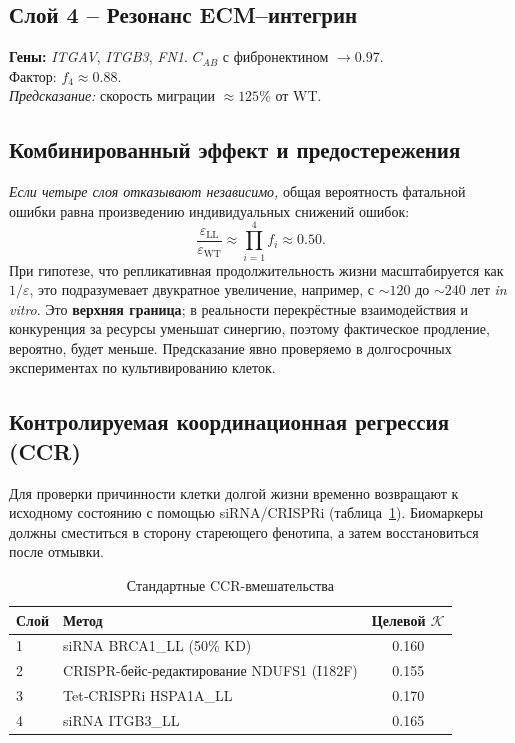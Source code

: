 \documentclass[12pt,a4paper]{article}
\newcommand{\REL}{\mathcal{K}}          %
\begin{document}
	\subsection{Слой 4 – Резонанс ECM–интегрин}
	\textbf{Гены:} \emph{ITGAV}, \emph{ITGB3}, \emph{FN1}. \(C_{AB}\) с фибронектином \(\to 0.97\). \\
	Фактор: \(f_4 \approx 0.88\). \\
	\textit{Предсказание:} скорость миграции \(\approx 125\%\) от WT.
	
	\subsection{Комбинированный эффект и предостережения}
	\textit{Если четыре слоя отказывают независимо,} общая вероятность фатальной ошибки равна произведению индивидуальных снижений ошибок:
	\[
	\frac{\varepsilon_{\mathrm{LL}}}{\varepsilon_{\mathrm{WT}}} \approx \prod_{i=1}^{4} f_i \approx 0.50.
	\]
	При гипотезе, что репликативная продолжительность жизни масштабируется как \(1/\varepsilon\), это подразумевает двукратное увеличение, например, с \(\sim 120\) до \(\sim 240\) лет \textit{in vitro}. Это \textbf{верхняя граница}; в реальности перекрёстные взаимодействия и конкуренция за ресурсы уменьшат синергию, поэтому фактическое продление, вероятно, будет меньше. Предсказание явно проверяемо в долгосрочных экспериментах по культивированию клеток.
	
	\subsection{Контролируемая координационная регрессия (CCR)}
	Для проверки причинности клетки долгой жизни временно возвращают к исходному состоянию с помощью siRNA/CRISPRi (таблица~\ref{tab:CCR}). Биомаркеры должны сместиться в сторону стареющего фенотипа, а затем восстановиться после отмывки.
	
	\begin{table}[H]
		\centering
		\caption{Стандартные CCR-вмешательства}
		\label{tab:CCR}
		\begin{tabular}{@{}llc@{}}
			\toprule
			\textbf{Слой} & \textbf{Метод} & \textbf{Целевой \(\REL\)} \\
			\midrule
			1 & siRNA BRCA1\_LL (50\% KD) & 0.160 \\
			2 & CRISPR-бейс-редактирование NDUFS1 (I182F) & 0.155 \\
			3 & Tet‑CRISPRi HSPA1A\_LL & 0.170 \\
			4 & siRNA ITGB3\_LL & 0.165 \\
			\bottomrule
		\end{tabular}
	\end{table}
	
\end{document}
